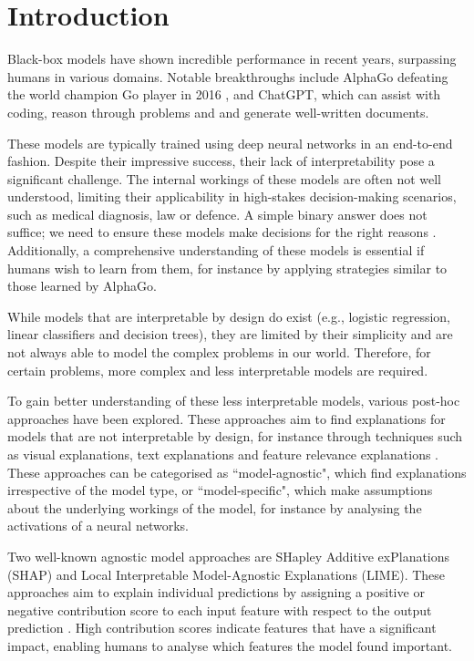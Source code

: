 \chapter{Introduction}

\setcounter{page}{1} %



Black-box models have shown incredible performance in recent years, surpassing humans in various domains. Notable breakthroughs include AlphaGo defeating the world champion Go player in 2016 \citep{fuAlphaGoMonteCarlo2016}, and ChatGPT, which can assist with coding, reason through problems and and generate well-written documents.

These models are typically trained using deep neural networks in an end-to-end fashion. Despite their impressive success, their lack of interpretability pose a significant challenge. The internal workings of these models are often not well understood, limiting their applicability in high-stakes decision-making scenarios, such as medical diagnosis, law or defence. A simple binary answer does not suffice; we need to ensure these models make decisions for the right reasons \cite{alammarExplainableAIGuide2021}. Additionally, a comprehensive understanding of these models is essential if humans wish to learn from them, for instance by applying strategies similar to those learned by AlphaGo.

While models that are interpretable by design do exist (e.g., logistic regression, linear classifiers and decision trees), they are limited by their simplicity and are not always able to model the complex problems in our world. Therefore, for certain problems, more complex and less interpretable models are required.

To gain better understanding of these less interpretable models, various post-hoc approaches have been explored. These approaches aim to find explanations for models that are not interpretable by design, for instance through techniques such as visual explanations, text explanations and feature relevance explanations \citep{barredoarrietaExplainableArtificialIntelligence2020a}. These approaches can be categorised as ``model-agnostic", which find explanations irrespective of the model type, or ``model-specific", which make assumptions about the underlying workings of the model, for instance by analysing the activations of a neural networks.

Two well-known agnostic model approaches are SHapley Additive exPlanations (SHAP) and Local Interpretable Model-Agnostic Explanations (LIME). These approaches aim to explain individual predictions by assigning a positive or negative contribution score to each input feature with respect to the output prediction \cite{lundbergUnifiedApproachInterpreting2017, molnarInterpretableMachineLearning2022}. High contribution scores indicate features that have a significant impact, enabling humans to analyse which features the model found important.

